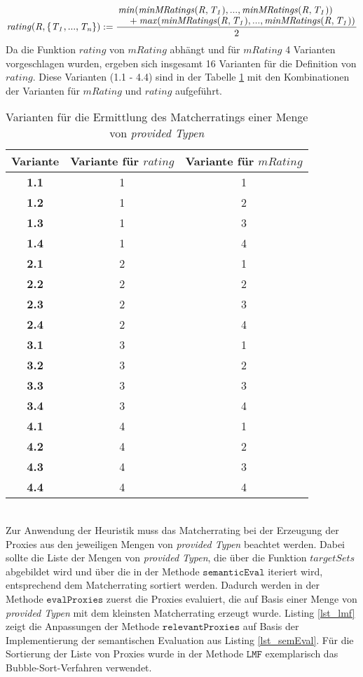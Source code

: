 \begin{gather*}
\mathit{rating(R,\{T_1,...,T_n\})} := 
	\frac{\splitfrac{\mathit{min(minMRatings(R,T_1),...,minMRatings(R,T_1))}}
	{+ \mathit{max(minMRatings(R,T_1),...,minMRatings(R,T_1))}}}{2}	
\end{gather*}
\noindent
Da die Funktion $\mathit{rating}$ von $\mathit{mRating}$ abhängt und für $\mathit{mRating}$ 4 Varianten vorgeschlagen wurden, ergeben sich insgesamt 16 Varianten für die Definition von $\mathit{rating}$. Diese Varianten (1.1 - 4.4) sind in der Tabelle \ref{tab_matcherratingvarianten} mit den Kombinationen der Varianten für $\mathit{mRating}$ und $\mathit{rating}$ aufgeführt.
\begin{table}[h!]
\centering
\small
\begin{tabular}{|c|c|c|}
\hline
\hline
\textbf{Variante} & Variante für $\mathit{rating}$ & Variante für $\mathit{mRating}$
\\
\hline
\hline
\textbf{1.1} & 1 & 1 \\
\hline
\textbf{1.2} & 1 & 2 \\
\hline
\textbf{1.3} & 1 & 3 \\
\hline
\textbf{1.4} & 1 & 4 \\
\hline
\textbf{2.1} & 2 & 1 \\
\hline
\textbf{2.2} & 2 & 2 \\
\hline
\textbf{2.3} & 2 & 3 \\
\hline
\textbf{2.4} & 2 & 4 \\
\hline
\textbf{3.1} & 3 & 1 \\
\hline
\textbf{3.2} & 3 &2 \\
\hline
\textbf{3.3} & 3 & 3 \\
\hline
\textbf{3.4} & 3 & 4 \\
\hline
\textbf{4.1} & 4 & 1 \\
\hline
\textbf{4.2} & 4 & 2 \\
\hline
\textbf{4.3} & 4 & 3 \\
\hline
\textbf{4.4} & 4 & 4 \\
\hline
\hline
\end{tabular}
\caption{Varianten für die Ermittlung des Matcherratings einer Menge von \emph{provided Typen}}
 \label{tab_matcherratingvarianten}
\end{table}
\noindent
\\
Zur Anwendung der Heuristik muss das Matcherrating bei der Erzeugung der Proxies aus den jeweiligen Mengen von \emph{provided Typen} beachtet werden. Dabei sollte die Liste der Mengen von \emph{provided Typen}, die über die Funktion $\mathit{targetSets}$ abgebildet wird und über die in der Methode $\texttt{semanticEval}$ iteriert wird, entsprechend dem Matcherrating sortiert werden. Dadurch werden in der Methode $\texttt{evalProxies}$ zuerst die Proxies evaluiert, die auf Basis einer Menge von \emph{provided Typen} mit dem kleinsten Matcherrating erzeugt wurde. Listing \ref{lst_lmf} zeigt die Anpassungen der Methode $\texttt{relevantProxies}$ auf Basis der Implementierung der semantischen Evaluation aus Listing \ref{lst_semEval}. Für die Sortierung der Liste von Proxies wurde in der Methode $\texttt{LMF}$ exemplarisch das Bubble-Sort-Verfahren verwendet.
